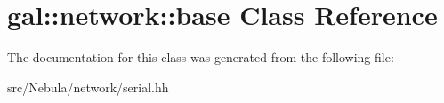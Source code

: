 \hypertarget{classgal_1_1network_1_1base}{\section{gal\-:\-:network\-:\-:base \-Class \-Reference}
\label{classgal_1_1network_1_1base}
}


\-The documentation for this class was generated from the following file\-:\begin{DoxyCompactItemize}
\item 
src/\-Nebula/network/serial.\-hh\end{DoxyCompactItemize}
